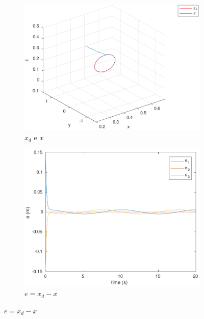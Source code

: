\documentclass[a4paper,11pt]{article}
\theoremstyle{mytheor}
\begin{document}
\begin{figure}[!ht]
\centering
  \begin{minipage}{\linewidth}
  \centering
    \begin{subfigure}[b]{1\textwidth}
    \includegraphics[width=1\textwidth]{figs/ex1_b_2_x.pdf}
    \caption{$x_d$ e $x$}
    \label{fig:ex1_b_2_x}
    \end{subfigure}
  \end{minipage}
  \begin{minipage}{\linewidth}
  \centering
    \begin{subfigure}[b]{0.45\textwidth}
    \includegraphics[width=1\textwidth]{figs/ex1_b_2_e.pdf}
    \caption{$e = x_d - x$}
    \label{fig:ex1_b_2_e}

\end{subfigure}
\end{minipage}
\end{figure}
\end{document}
